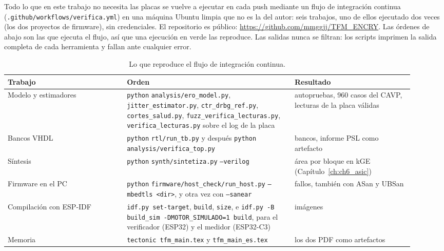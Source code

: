 Todo lo que en este trabajo no necesita las placas se vuelve a ejecutar en
cada push mediante un flujo de integración continua
(\nolinkurl{.github/workflows/verifica.yml}) en una máquina Ubuntu limpia que
no es la del autor: seis trabajos, uno de ellos ejecutado dos veces (los
dos proyectos de firmware), sin credenciales. El repositorio es
público: \url{https://github.com/mmggjj/TFM_ENCRY}. Las órdenes de abajo
son las que ejecuta el flujo, así que una ejecución en verde las
reproduce. Las salidas nunca se filtran: los scripts imprimen la salida
completa de cada herramienta y fallan ante cualquier error.

\begin{table}[htbp]
\centering\small
\caption{Lo que reproduce el flujo de integración continua.}
\label{tab:app_ci}
\begin{tabular}{@{}>{\raggedright\arraybackslash}p{0.27\linewidth}>{\raggedright\arraybackslash}p{0.38\linewidth}>{\raggedright\arraybackslash}p{0.27\linewidth}@{}}
\toprule
Trabajo & Orden & Resultado \\
\midrule
Modelo y estimadores & \texttt{python} \nolinkurl{analysis/ero_model.py},
  \texttt{jitter\_estimator.py}, \texttt{ctr\_drbg\_ref.py},
  \texttt{cortes\_salud.py}, \texttt{fuzz\_verifica\_lecturas.py},
  \texttt{verifica\_lecturas.py} sobre el log de la placa & autopruebas, 960
  casos del \ac{CAVP}, lecturas de la placa válidas \\
Bancos \ac{VHDL} & \texttt{python} \nolinkurl{rtl/run_tb.py} y después
  \texttt{python} \nolinkurl{analysis/verifica_top.py} & 13 bancos, informe \acs{PSL}
  como artefacto \\
Síntesis & \texttt{python} \nolinkurl{synth/sintetiza.py} \texttt{--verilog} & área por bloque en
  kGE (Capítulo~\ref{ch:ch6_asic}) \\
Firmware en el PC & \texttt{python} \nolinkurl{firmware/host_check/run_host.py}
  \texttt{--mbedtls <dir>}, y otra vez con \texttt{--sanear} & 0 fallos, también con
  ASan y UBSan \\
Compilación con ESP-IDF & \texttt{idf.py set-target}, \texttt{build},
  \texttt{size}, e \texttt{idf.py -B build\_sim -DMOTOR\_SIMULADO=1 build},
  para el verificador (ESP32) y el medidor (ESP32-C3) & 4 imágenes \\
Memoria & \texttt{tectonic tfm\_main.tex} y \texttt{tfm\_main\_es.tex} &
  los dos PDF como artefactos \\
\bottomrule
\end{tabular}
\end{table}

